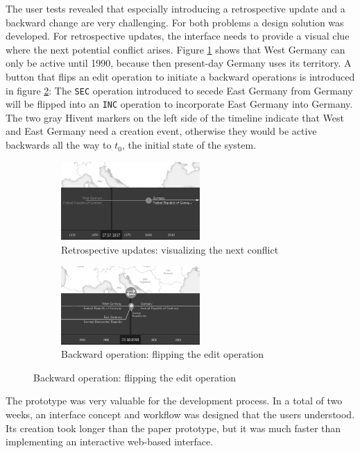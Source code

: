 The user tests revealed that especially introducing a retrospective update and a backward change are very challenging. For both problems a design solution was developed. For retrospective updates, the interface needs to provide a visual clue where the next potential conflict arises. Figure \ref{sfig:retrospective_update} shows that West Germany can only be active until 1990, because then present-day Germany uses its territory. A button that flips an edit operation to initiate a backward operations is introduced in figure \ref{sfig:backward_change}: The \texttt{SEC} operation introduced to secede East Germany from Germany will be flipped into an \texttt{INC} operation to incorporate East Germany into Germany. The two gray Hivent markers on the left side of the timeline indicate that West and East Germany need a creation event, otherwise they would be active backwards all the way to $t_0$, the initial state of the system.

\begin{figure}[ht]
\centering
\begin{subfigure}[b]{.5\textwidth}
  \centering
  \includegraphics[width=200px]{graphics/development/user_interface_design_process/retrospective_update.png}
  \caption{Retrospective updates: visualizing the next conflict}
  \label{sfig:retrospective_update}
\end{subfigure}%
\begin{subfigure}[b]{.5\textwidth}
  \centering
  \includegraphics[width=200px]{graphics/development/user_interface_design_process/backward_change.png}
  \caption{Backward operation: flipping the edit operation}
  \label{sfig:backward_change}
\end{subfigure}
\label{fig:backward_change}
\end{figure}

The prototype was very valuable for the development process. In a total of two weeks, an interface concept and workflow was designed that the users understood. Its creation took longer than the paper prototype, but it was much faster than implementing an interactive web-based interface.


